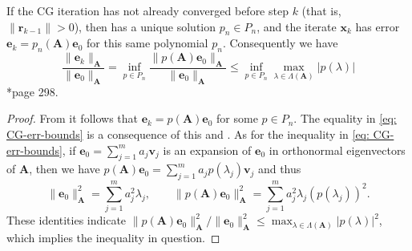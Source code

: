 \begin{thm} \label{theorem: CG-convg}
    If the CG iteration has not already converged before step $k$ (that is, $\| \bm{r}_{k-1} \| > 0 $), then  has a unique solution $p_n \in P_n$, and the iterate $\bm{x}_{k}$ has error $\bm{e}_k = p_n \left( \bm{A} \right) \bm{e}_{0}$ for this same polynomial $p_n$. Consequently we have
    \begin{equation} \label{eq: CG-err-bounds}
        \frac{\| \bm{e}_k \|_{\bm{A}}}{\| \bm{e}_{0} \|_{\bm{A}}} = \inf_{p \in P_n} \frac{\| p \left( \bm{A} \right) \bm{e}_{0} \|_{\bm{A}}}{\| \bm{e}_{0} \|_{\bm{A}}} \leq \inf_{p \in P_n} \max_{\lambda \in \Lambda \left( \bm{A} \right)} \left| p (\lambda) \right|
    \end{equation}
    \cite{TrefethenLloydN.LloydNicholas1997Nla/}*{page 298}.
\end{thm}

\begin{proof}
    From  it follows that $\bm{e}_{k} = p \left( \bm{A} \right) \bm{e}_{0}$ for some $p \in P_n$. The equality in \ref{eq: CG-err-bounds} is a consequence of this and . As for the inequality in \ref{eq: CG-err-bounds}, if $\bm{e}_{0} = \sum_{j=1}^{m} a_j \bm{v}_j$ is an expansion of $\bm{e}_{0}$ in orthonormal eigenvectors of $\bm{A}$, then we have $p \left( \bm{A} \right) \bm{e}_{0} = \sum_{j=1}^{m} a_j p \left( \lambda_j \right) \bm{v}_{j}$ and thus
    \[
        \| \bm{e}_{0} \|_{\bm{A}}^{2} = \sum_{j=1}^{m} a_{j}^{2} \lambda_j, \qquad \| p \left( \bm{A} \right) \bm{e}_0 \|_{\bm{A}}^{2} = \sum_{j=1}^{m} a_{j}^{2} \lambda_j \left( p \left( \lambda_j \right) \right)^{2}.
    \]
    These identities indicate $\| p \left( \bm{A} \right) \bm{e}_{0} \|_{\bm{A}}^{2} / \| \bm{e}_{0} \|_{\bm{A}}^{2} \leq \max_{\lambda \in \Lambda \left( \bm{A} \right)} \left| p (\lambda) \right|^{2}$, which implies the inequality in question.
\end{proof}